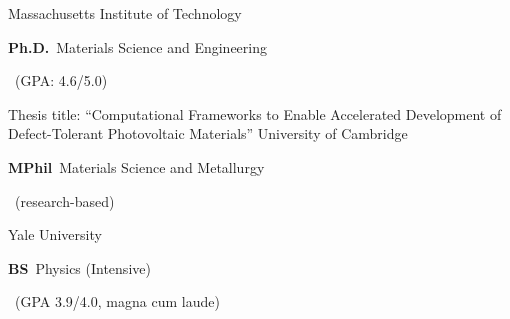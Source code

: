 	{%
		Massachusetts Institute of Technology}
	{%
		\textbf{Ph.D.}~Materials Science and Engineering\begin{footnotesize}
                        ~(GPA: 4.6/5.0)
                 \end{footnotesize}}
	{%
	Thesis title: ``Computational Frameworks to Enable Accelerated Development of Defect-Tolerant Photovoltaic Materials''
	}
\vspace{-3mm}
		{%
			University of Cambridge}
		{%
			\textbf{MPhil}~Materials Science and Metallurgy\begin{footnotesize}
                               ~(research-based)
                         \end{footnotesize}}
		{%
		}
\vspace{-3mm}	
		{%
			Yale University}
		{%
			\textbf{BS}~Physics (Intensive)\begin{footnotesize}
                               ~(GPA 3.9/4.0, magna cum laude)
                       \end{footnotesize}}
		{%
		}
